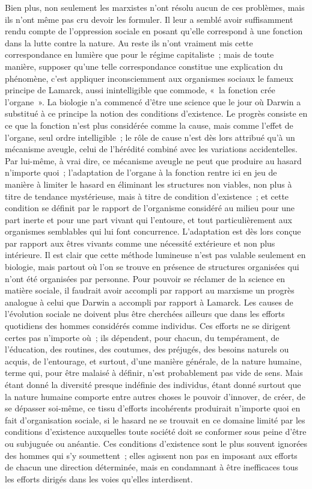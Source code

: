 \documentclass[french,twoside]{book} %
\begin{document}
Bien plus, non seulement les marxistes n'ont résolu aucun de ces problèmes, mais ils n'ont même pas cru devoir les formuler. Il leur a semblé avoir suffisamment rendu compte de l'oppression sociale en posant qu'elle correspond à une fonction dans la lutte contre la nature. Au reste ils n'ont vraiment mis cette correspondance en lumière que pour le régime capitaliste ; mais de toute manière, supposer qu'une telle correspondance constitue une explication du phénomène, c'est appliquer inconsciemment aux organismes sociaux le fameux principe de Lamarck, aussi inintelligible que commode, « la fonction crée l'organe ». La biologie n'a commencé d'être une science que le jour où Darwin a substitué à ce principe la notion des conditions d'existence. Le progrès consiste en ce que la fonction n'est plus considérée comme la cause, mais comme l'effet de l'organe, seul ordre intelligible ; le rôle de cause n'est dès lors attribué qu'à un mécanisme aveugle, celui de l'hérédité combiné avec les variations accidentelles. Par lui-même, à vrai dire, ce mécanisme aveugle ne peut que produire au hasard n'importe quoi ; l'adaptation de l'organe à la fonction rentre ici en jeu de manière à limiter le hasard en éliminant les structures non viables, non plus à titre de tendance mystérieuse, mais à titre de condition d'existence ; et cette condition se définit par le rapport de l'organisme considéré au milieu pour une part inerte et pour une part vivant qui l'entoure, et tout particulièrement aux organismes semblables qui lui font concurrence. L'adaptation est dès lors conçue par rapport aux êtres vivants comme une nécessité extérieure et non plus intérieure. Il est clair que cette méthode lumineuse n'est pas valable seulement en biologie, mais partout où l'on se trouve en présence de structures organisées qui n'ont été organisées par personne. Pour pouvoir se réclamer de la science en matière sociale, il faudrait avoir accompli par rapport au marxisme un progrès analogue à celui que Darwin a accompli par rapport à Lamarck. Les causes de l'évolution sociale ne doivent plus être cherchées ailleurs que dans les efforts quotidiens des hommes considérés comme individus. Ces efforts ne se dirigent certes pas n'importe où ; ils dépendent, pour chacun, du tempérament, de l'éducation, des routines, des coutumes, des préjugés, des besoins naturels ou acquis, de l'entourage, et surtout, d'une manière générale, de la nature humaine, terme qui, pour être malaisé à définir, n'est probablement pas vide de sens. Mais étant donné la diversité presque indéfinie des individus, étant donné surtout que la nature humaine comporte entre autres choses le pouvoir d'innover, de créer, de se dépasser soi-même, ce tissu d'efforts incohérents produirait n'importe quoi en fait d'organisation sociale, si le hasard ne se trouvait en ce domaine limité par les conditions d'existence auxquelles toute société doit se conformer sous peine d'être ou subjuguée ou anéantie. Ces conditions d'existence sont le plus souvent ignorées des hommes qui s'y soumettent ; elles agissent non pas en imposant aux efforts de chacun une direction déterminée, mais en condamnant à être inefficaces tous les efforts dirigés dans les voies qu'elles interdisent.\par
\end{document}
